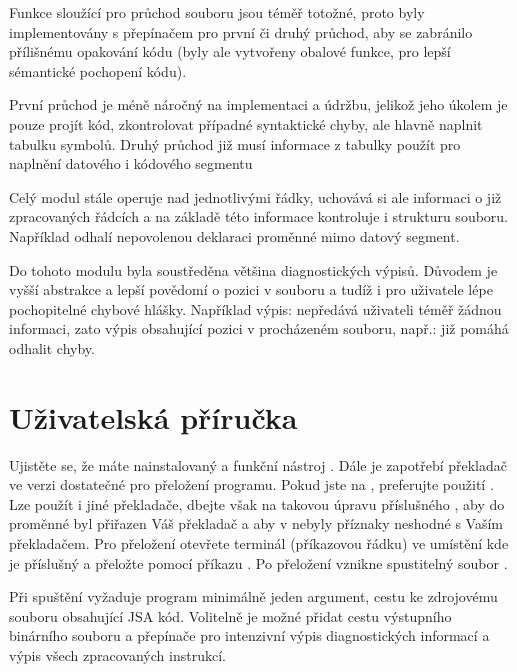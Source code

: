 \documentclass[czech, kiv, he, sem, pdf, viewonly]{fasthesis}
\begin{document}
Funkce sloužící pro průchod souboru jsou téměř totožné, proto byly
implementovány s přepínačem pro první či druhý průchod, aby se zabránilo
přílišnému opakování kódu (byly ale vytvořeny obalové funkce, pro lepší
sémantické pochopení kódu).

První průchod je méně náročný na implementaci a údržbu, jelikož jeho úkolem je
pouze projít kód, zkontrolovat případné syntaktické chyby, ale hlavně naplnit
tabulku symbolů. Druhý průchod již musí informace z tabulky použít pro naplnění
datového i kódového segmentu

Celý modul stále operuje nad jednotlivými řádky, uchovává si ale informaci o již
zpracovaných řádcích a na základě této informace kontroluje i strukturu souboru.
Například odhalí nepovolenou deklaraci proměnné mimo datový segment.

Do tohoto modulu byla soustředěna většina diagnostických výpisů. Důvodem je
vyšší abstrakce a lepší povědomí o pozici v souboru a tudíž i pro uživatele lépe
pochopitelné chybové hlášky. Například výpis: 
nepředává uživateli téměř žádnou informaci, zato výpis obsahující pozici v
procházeném souboru, např.:  již pomáhá odhalit
chyby.

\chapter{Uživatelská příručka}\label{chp:manual}

Ujistěte se, že máte nainstalovaný a funkční nástroj . Dále je
zapotřebí překladač  ve verzi dostatečné pro přeložení 
programu. Pokud jste na , preferujte použití .
Lze použít i jiné překladače, dbejte však na takovou úpravu příslušného
, aby do proměnné  byl přiřazen Váš překladač a
aby v  nebyly příznaky neshodné s Vaším překladačem. Pro
přeložení otevřete terminál (příkazovou řádku) ve umístění kde je příslušný
 a přeložte pomocí příkazu . Po přeložení
vznikne spustitelný soubor .



Při spuštění vyžaduje program minimálně jeden argument, cestu ke zdrojovému
souboru obsahující JSA kód. Volitelně je možné přidat cestu výstupního binárního
souboru a přepínače pro intenzivní výpis diagnostických informací a výpis všech
zpracovaných instrukcí.
\end{document}
